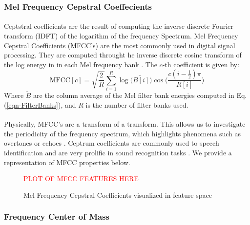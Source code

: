 \documentclass[12pt,letterpaper]{article}
\begin{document}

\subsubsection{Mel Frequency Cepstral Coeffecients}

\paragraph*{}Ceptstral coefficients are the result of computing the inverse discrete Fourier transform (IDFT) of the logarithm of the frequency Spectrum. Mel Frequency Cepstral Coefficients (MFCC's) are the most commonly used in digital signal processing. They are computed throught he inverse discrete cosine transform of the log energy in in each Mel frequency bank \cite{Serizel,Sahidullah}. The $c$-th coefficient is given by:
\begin{equation}
\label{feat-MFCC}
\text{MFCC}[c] = \sqrt{\frac{2}{R}} \sum_{i=1}^{R} 
\log\big(\widetilde{B[i]}\big) \cos\bigg(\frac{c(i-\frac{1}{2})\pi}{R[i]}\bigg)
\end{equation}
Where $\widetilde{B}$ are the column average of the Mel filter bank energies computed in Eq. (\ref{eqn-FilterBanks}), and $R$ is the number of filter banks used.

\paragraph*{}Physically, MFCC's are a transform of a transform. This allows us to investigate the periodicity of the frequency spectrum, which highlights phenomena such as overtones or echoes \cite{Virtanen}. Ceptrum coefficients are commonly used to speech identification and are very prolific in sound recognition tasks \cite{Serizel,Sahidullah,Liu}. We provide a representation of MFCC properties below.

\begin{figure}[H]
\label{fig-FeatureMFCC}
\begin{center}
\textcolor{red}{PLOT OF MFCC FEATURES HERE}
\end{center}
\caption{Mel Frequency Cepstral Coefficients visualized in feature-space}
\end{figure}


\subsubsection{Frequency Center of Mass}
\end{document}
